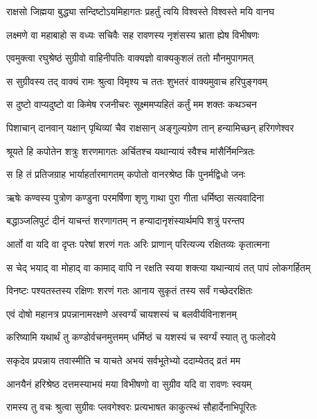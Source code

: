 \twolineshloka
{राक्षसो जिह्मया बुद्ध्या सन्दिष्टोऽयमिहागतः}
{प्रहर्तुं त्वयि विश्वस्ते विश्वस्ते मयि वानघ} %

\twolineshloka
{लक्ष्मणे वा महाबाहो स वध्यः सचिवैः सह}
{रावणस्य नृशंसस्य भ्राता ह्येष विभीषणः} %

\twolineshloka
{एवमुक्त्वा रघुश्रेष्ठं सुग्रीवो वाहिनीपतिः}
{वाक्यज्ञो वाक्यकुशलं ततो मौनमुपागमत्} %

\twolineshloka
{स सुग्रीवस्य तद् वाक्यं रामः श्रुत्वा विमृश्य च}
{ततः शुभतरं वाक्यमुवाच हरिपुङ्गवम्} %

\twolineshloka
{स दुष्टो वाप्यदुष्टो वा किमेष रजनीचरः}
{सूक्ष्ममप्यहितं कर्तुं मम शक्तः कथञ्चन} %

\twolineshloka
{पिशाचान् दानवान् यक्षान् पृथिव्यां चैव राक्षसान्}
{अङ्गुल्यग्रेण तान् हन्यामिच्छन् हरिगणेश्वर} %

\twolineshloka
{श्रूयते हि कपोतेन शत्रुः शरणमागतः}
{अर्चितश्च यथान्यायं स्वैश्च मांसैर्निमन्त्रितः} %

\twolineshloka
{स हि तं प्रतिजग्राह भार्याहर्तारमागतम्}
{कपोतो वानरश्रेष्ठ किं पुनर्मद्विधो जनः} %

\twolineshloka
{ऋषेः कण्वस्य पुत्रोण कण्डुना परमर्षिणा}
{शृणु गाथा पुरा गीता धर्मिष्ठा सत्यवादिना} %

\twolineshloka
{बद्धाञ्जलिपुटं दीनं याचन्तं शरणागतम्}
{न हन्यादानृशंस्यार्थमपि शत्रुं परन्तप} %

\twolineshloka
{आर्तो वा यदि वा दृप्तः परेषां शरणं गतः}
{अरिः प्राणान् परित्यज्य रक्षितव्यः कृतात्मना} %

\twolineshloka
{स चेद् भयाद् वा मोहाद् वा कामाद् वापि न रक्षति}
{स्वया शक्त्या यथान्यायं तत् पापं लोकगर्हितम्} %

\twolineshloka
{विनष्टः पश्यतस्तस्य रक्षिणः शरणं गतः}
{आनाय सुकृतं तस्य सर्वं गच्छेदरक्षितः} %

\twolineshloka
{एवं दोषो महानत्र प्रपन्नानामरक्षणे}
{अस्वर्ग्यं चायशस्यं च बलवीर्यविनाशनम्} %

\twolineshloka
{करिष्यामि यथार्थं तु कण्डोर्वचनमुत्तमम्}
{धर्मिष्ठं च यशस्यं च स्वर्ग्यं स्यात् तु फलोदये} %

\twolineshloka
{सकृदेव प्रपन्नाय तवास्मीति च याचते}
{अभयं सर्वभूतेभ्यो ददाम्येतद् व्रतं मम} %

\twolineshloka
{आनयैनं हरिश्रेष्ठ दत्तमस्याभयं मया}
{विभीषणो वा सुग्रीव यदि वा रावणः स्वयम्} %

\twolineshloka
{रामस्य तु वचः श्रुत्वा सुग्रीवः प्लवगेश्वरः}
{प्रत्यभाषत काकुत्स्थं सौहार्देनाभिपूरितः} %


